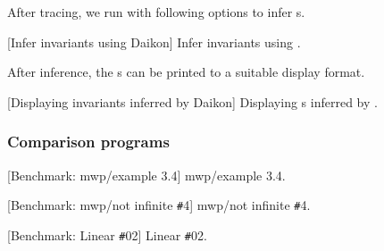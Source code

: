 After tracing, we run  with following options to infer
s.

\begin{center}
\begin{minipage}{\textwidth}
\captionsetup{type=lstlisting}
[Infer invariants using Daikon]
{Infer invariants using .}
\label{lst:daikon-bash}
\end{minipage}
\end{center}

After inference, the s can be printed to a suitable display
format.

\begin{center}
\begin{minipage}{\textwidth}
\captionsetup{type=lstlisting}
[Displaying invariants inferred by Daikon]
{Displaying s inferred by .}
\label{lst:print-bash}
\end{minipage}
\end{center}

\subsubsection{Comparison programs}
\label{subsec:comparison-programs}

\begin{center}
\begin{minipage}[t]{.47\textwidth}
\captionsetup{type=lstlisting}
[Benchmark: mwp/example 3.4]
    {mwp/example 3.4.}
\label{lst:ex34}
\end{minipage}\hfill
\begin{minipage}[t]{.50\textwidth}
\captionsetup{type=lstlisting}
[Benchmark: mwp/not infinite \texttt{\#}4]
    {mwp/not infinite \texttt{\#}4.}
\label{lst:ni4}
\end{minipage}
\end{center}%
\begin{center}
\begin{minipage}[t]{.50\textwidth}
\captionsetup{type=lstlisting}
[Benchmark: Linear \texttt{\#}02]
    {Linear \texttt{\#}02.}
\label{lst:l2}
\end{minipage}
\end{center}

